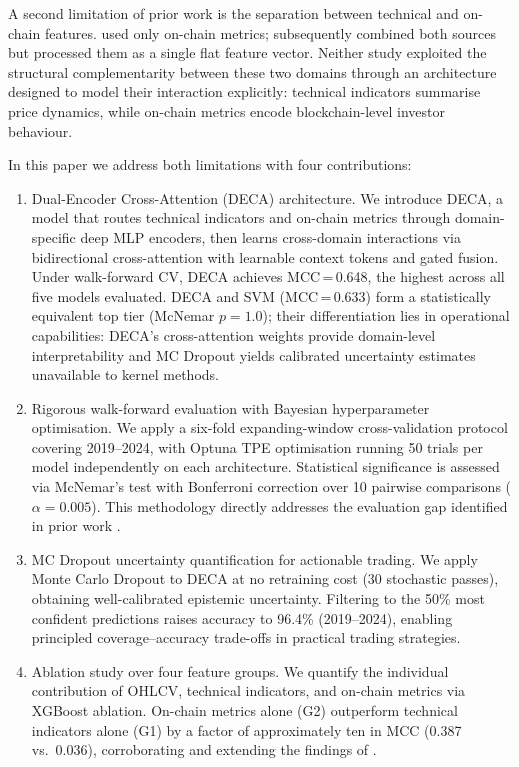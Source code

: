 \documentclass[final,3p,times,authoryear]{elsarticle}
\begin{document}
A second limitation of prior work is the separation between technical
and on-chain features.
\citet{omole2024financial} used only on-chain metrics;
\citet{omole2025eaai} subsequently combined both sources
but processed them as a single flat feature vector.
Neither study exploited the structural complementarity between these two
domains through an architecture designed to model their interaction
explicitly: technical indicators summarise price dynamics, while on-chain
metrics encode blockchain-level investor behaviour.

In this paper we address both limitations with four contributions:

\begin{enumerate}

  \item Dual-Encoder Cross-Attention (DECA) architecture.
  We introduce DECA, a model that routes technical indicators and on-chain
  metrics through domain-specific deep MLP encoders, then learns
  cross-domain interactions via bidirectional cross-attention
  \citep{vaswani2017attention} with learnable context tokens and gated
  fusion.
  Under walk-forward CV, DECA achieves MCC\,=\,0.648, the highest
  across all five models evaluated.
  DECA and SVM (MCC\,=\,0.633) form a statistically equivalent top tier
  (McNemar $p=1.0$); their differentiation lies in operational
  capabilities: DECA's cross-attention weights provide domain-level
  interpretability and MC Dropout yields calibrated uncertainty estimates
  unavailable to kernel methods.

  \item Rigorous walk-forward evaluation with Bayesian hyperparameter
  optimisation.
  We apply a six-fold expanding-window cross-validation protocol
  covering 2019--2024, with Optuna TPE optimisation
  \citep{akiba2019optuna} running 50 trials per model independently on
  each architecture.
  Statistical significance is assessed via McNemar's test
  \citep{dietterich1998mcnemar} with Bonferroni correction over 10
  pairwise comparisons ($\alpha = 0.005$).
  This methodology directly addresses the evaluation gap identified in
  prior work \citep{bergmeir2012time}.

  \item MC Dropout uncertainty quantification for actionable trading.
  We apply Monte Carlo Dropout \citep{gal2016dropout} to DECA at no
  retraining cost (30 stochastic passes), obtaining well-calibrated
  epistemic uncertainty.
  Filtering to the 50\% most confident predictions raises accuracy to
  96.4\% (2019--2024), enabling principled coverage--accuracy trade-offs
  in practical trading strategies.

  \item Ablation study over four feature groups.
  We quantify the individual contribution of OHLCV, technical indicators,
  and on-chain metrics via XGBoost ablation.
  On-chain metrics alone (G2) outperform technical indicators alone (G1)
  by a factor of approximately ten in MCC (0.387 vs.\ 0.036),
  corroborating and extending the findings of \citet{omole2025eaai}.

\end{enumerate}
\end{document}
